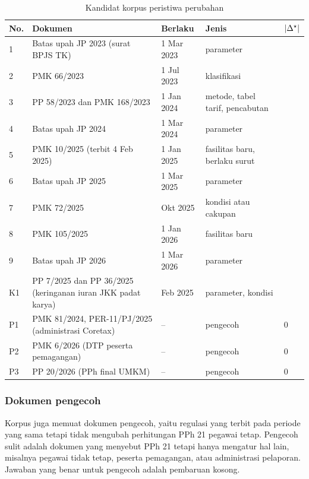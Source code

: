 \begin{table}[t]
\centering
\caption{Kandidat korpus peristiwa perubahan}
\label{tab:korpus}
\scriptsize
\begin{tabularx}{\columnwidth}{@{}P{0.35cm} L P{1.25cm} P{1.6cm} P{0.45cm}@{}}
\toprule
\textbf{No.} & \textbf{Dokumen} & \textbf{Berlaku} & \textbf{Jenis} & $|\Delta^{\star}|$ \\
 & Batas upah JP 2023 (surat BPJS TK) & 1 Mar 2023 & parameter & \isian{} \\
2 & PMK 66/2023 & 1 Jul 2023 & klasifikasi & \isian{} \\
3 & PP 58/2023 dan PMK 168/2023 & 1 Jan 2024 & metode, tabel tarif, pencabutan & \isian{} \\
4 & Batas upah JP 2024 & 1 Mar 2024 & parameter & \isian{} \\
5 & PMK 10/2025 (terbit 4 Feb 2025) & 1 Jan 2025 & fasilitas baru, berlaku surut & \isian{} \\
6 & Batas upah JP 2025 & 1 Mar 2025 & parameter & \isian{} \\
7 & PMK 72/2025 & Okt 2025 & kondisi atau cakupan & \isian{} \\
8 & PMK 105/2025 & 1 Jan 2026 & fasilitas baru & \isian{} \\
9 & Batas upah JP 2026 & 1 Mar 2026 & parameter & \isian{} \\
\midrule
K1 & PP 7/2025 dan PP 36/2025 (keringanan iuran JKK padat karya) & Feb 2025 & parameter, kondisi & \isian{} \\
\midrule
P1 & PMK 81/2024, PER-11/PJ/2025 (administrasi Coretax) & -- & pengecoh & 0 \\
P2 & PMK 6/2026 (DTP peserta pemagangan) & -- & pengecoh & 0 \\
P3 & PP 20/2026 (PPh final UMKM) & -- & pengecoh & 0 \\
\bottomrule
\end{tabularx}
\end{table}


\subsubsection{Dokumen pengecoh}
Korpus juga memuat dokumen pengecoh, yaitu regulasi yang terbit pada periode yang sama tetapi tidak mengubah perhitungan PPh 21 pegawai tetap. Pengecoh sulit adalah dokumen yang menyebut PPh 21 tetapi hanya mengatur hal lain, misalnya pegawai tidak tetap, peserta pemagangan, atau administrasi pelaporan. Jawaban yang benar untuk pengecoh adalah pembaruan kosong.

